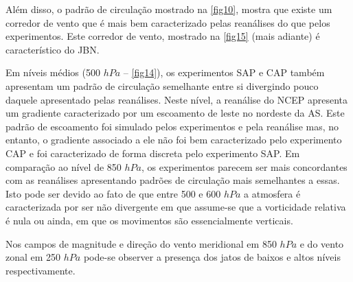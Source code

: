 Além disso, o padrão de circulação mostrado na \autoref{fig10}, mostra que existe um corredor de vento que é mais bem caracterizado pelas reanálises do que pelos experimentos. Este corredor de vento, mostrado na \autoref{fig15} (mais adiante) é característico do JBN. 





Em níveis médios (500 $hPa$ – \autoref{fig14}), os experimentos SAP e CAP também apresentam um padrão de circulação semelhante entre si divergindo pouco daquele apresentado pelas reanálises. Neste nível, a reanálise do NCEP apresenta um gradiente caracterizado por um escoamento de leste no nordeste da AS. Este padrão de escoamento foi simulado pelos experimentos e pela reanálise mas, no entanto, o gradiente associado a ele não foi bem caracterizado pelo experimento CAP e foi caracterizado de forma discreta pelo experimento SAP. Em comparação ao nível de 850 $hPa$, os experimentos parecem ser mais concordantes com as reanálises apresentando padrões de circulação mais semelhantes a essas. Isto pode ser devido ao fato de que entre 500 e 600 $hPa$ a atmosfera é caracterizada por ser não divergente em que assume-se que a vorticidade relativa é nula ou ainda, em que os movimentos são essencialmente verticais.



Nos campos de magnitude e direção do vento meridional em 850 $hPa$ e do vento zonal em 250 $hPa$ pode-se observer a presença dos jatos de baixos e altos níveis respectivamente.

